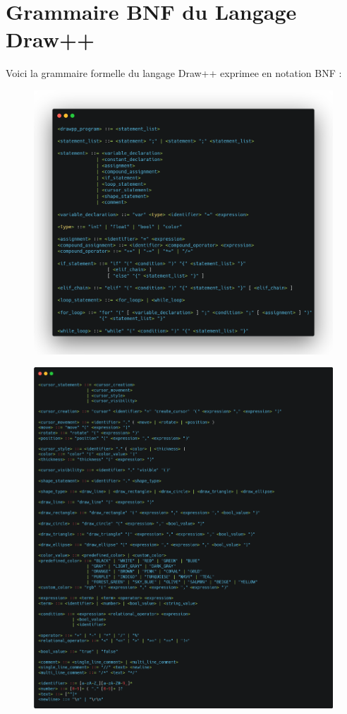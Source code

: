 \documentclass[12pt,a4paper]{report}
\begin{document}
\section{Grammaire BNF du Langage Draw++}
Voici la grammaire formelle du langage Draw++ exprimee en notation BNF :
\begin{figure}[H]
    \centering
    \includegraphics[width=0.9\linewidth]{assets/code/bnf1.png}
\end{figure}
\begin{figure}[H]
    \centering
    \includegraphics[width=1\linewidth]{assets/code/bnf2-3.png}
\end{figure}
\end{document}
